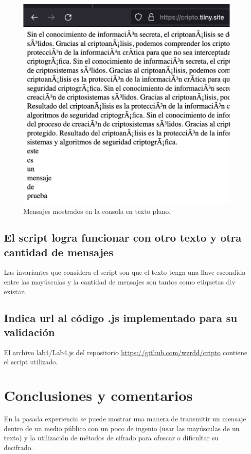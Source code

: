 \documentclass[letter,12pt]{article}
\begin{document}
\begin{figure}[H]
  \centering
  \includegraphics[width=13cm]{images/04-msgs.png}
  \caption{Mensajes mostrados en la consola en texto plano.}
\end{figure}

\subsection{El script logra funcionar con otro texto y otra cantidad de mensajes}
Las invariantes que considera el script son que el texto tenga una llave escondida entre las mayúsculas y la cantidad de mensajes son tantos como etiquetas div existan.

\subsection{Indica url al código .js implementado para su validación}
El archivo lab4/Lab4.js del repositorio \url{https://github.com/wzrdd/cripto} contiene el script utilizado.

\section*{Conclusiones y comentarios}
En la pasada experiencia se puede mostrar una manera de transmitir un mensaje dentro de un medio público con un poco de ingenio (usar las mayúsculas de un texto) y la utilización de métodos de cifrado para ofuscar o dificultar su decifrado.
\end{document}
